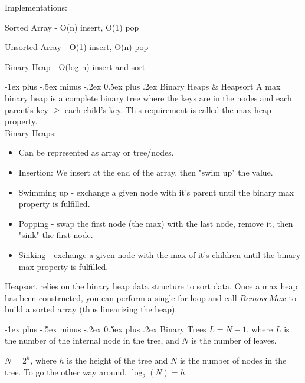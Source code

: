 \documentclass[letterpaper, 8pt]{extarticle}
\makeatletter
\renewcommand{\section}{\@startsection{section}{1}{0mm}%
                                {-1ex plus -.5ex minus -.2ex}%
                                {0.5ex plus .2ex}%
                                {\normalfont\normalsize\bfseries}}
\makeatother
\begin{document}
\begin{multicols*}{4}
    Implementations:
    \begin{list}{}{}
        \item Sorted Array - O(n) insert, O(1) pop
        \item Unsorted Array - O(1) insert, O(n) pop
        \item Binary Heap - O(log n) insert and sort
    \end{list}

    \section{Binary Heaps \& Heapsort}
    A max binary heap is a complete binary tree where the keys are in the nodes and each parent's key $\geq$ each child's key. This requirement is called the max heap property.
    \\
    Binary Heaps:
    \begin{itemize}
        \item Can be represented as array or tree/nodes.
        \item Insertion: We insert at the end of the array, then "swim up" the value.
        \item Swimming up - exchange a given node with it's parent until the binary max property is fulfilled.
        \item Popping - swap the first node (the max) with the last node, remove it, then "sink" the first node.
        \item Sinking - exchange a given node with the max of it's children until the binary max property is fulfilled.
    \end{itemize}

    Heapsort relies on the binary heap data structure to sort data. Once a max heap has been constructed, you can perform a single for loop and call $RemoveMax$ to build a sorted array (thus linearizing the heap).

    \section{Binary Trees}
    $L = N - 1$, where $L$ is the number of the internal node in the tree,
    and $N$ is the number of leaves.

    $N = 2^h$, where $h$ is the height of the tree and $N$ is the number of nodes in the tree.
    To go the other way around, $\log_2(N) = h$.

\end{multicols*}
\end{document}
